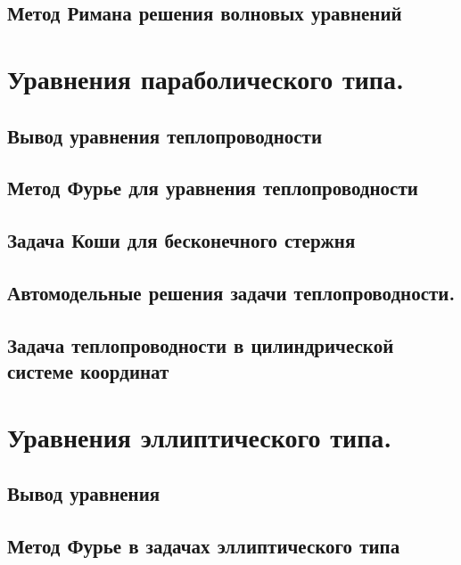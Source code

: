 \documentclass[12pt, a4paper]{article}
\begin{document}
	\subsection{Метод Римана решения волновых уравнений}
		 \newpage 

\section{Уравнения параболического типа.}
	\subsection{Вывод уравнения теплопроводности}\label{que:2}
		 \newpage

	\subsection{Метод Фурье для уравнения теплопроводности}\label{que:16}
		 \newpage

	\subsection{Задача Коши для бесконечного стержня}\label{que:17}
		 \newpage		

	\subsection{Автомодельные решения задачи теплопроводности.}
			\newpage

	\subsection{Задача теплопроводности в цилиндрической системе координат}
		 \newpage

\section{Уравнения эллиптического типа.}
	\subsection{Вывод уравнения}
		 \newpage

	\subsection{Метод Фурье в задачах эллиптического типа}
		 
\end{document}
